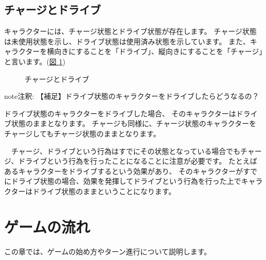 \documentclass[letterpaper,10pt,dvipdfmx]{sphinxmanual}
\begin{document}
\subsection{チャージとドライブ}
\label{\detokenize{common/01-base:id10}}
キャラクターには、チャージ状態とドライブ状態が存在します。
チャージ状態は未使用状態を示し、ドライブ状態は使用済み状態を示しています。
また、キャラクターを横向きにすることを「ドライブ」、縦向きにすることを「チャージ」と言います。(\hyperref[\detokenize{common/01-base:chargedrive}]{図 \ref{\detokenize{common/01-base:chargedrive}}})

\begin{figure}[htbp]
\centering
\capstart

\noindent{}
\caption{チャージとドライブ}\label{\detokenize{common/01-base:id13}}\label{\detokenize{common/01-base:chargedrive}}\end{figure}

\begin{sphinxadmonition}{note}{注釈:}
【補足】ドライブ状態のキャラクターをドライブしたらどうなるの？

ドライブ状態のキャラクターをドライブした場合、
そのキャラクターはドライブ状態のままとなります。
チャージも同様に、チャージ状態のキャラクターをチャージしてもチャージ状態のままとなります。

　チャージ、ドライブという行為はすでにその状態となっている場合でもチャージ、ドライブという行為を行ったことになることに注意が必要です。
たとえばあるキャラクターをドライブするという効果があり、
そのキャラクターがすでにドライブ状態の場合、効果を発揮してドライブという行為を行った上でキャラクターはドライブ状態のままということになります。
\end{sphinxadmonition}


\section{ゲームの流れ}
\label{\detokenize{common/02-turn:id1}}\label{\detokenize{common/02-turn::doc}}
この章では、ゲームの始め方やターン進行について説明します。
\end{document}
